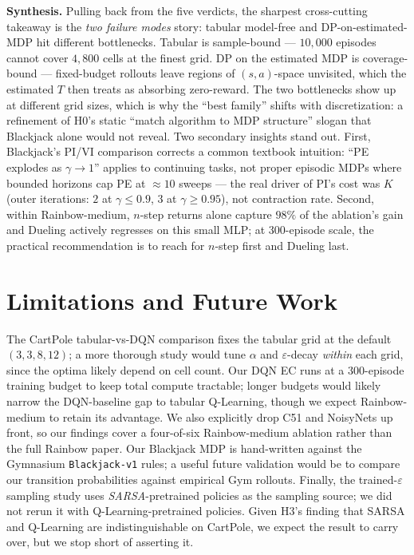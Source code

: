 \documentclass[conference]{IEEEtran}
\begin{document}
\textbf{Synthesis.} Pulling back from the five verdicts, the
sharpest cross-cutting takeaway is the \emph{two failure modes}
story: tabular model-free and DP-on-estimated-MDP hit different
bottlenecks. Tabular is sample-bound --- $10{,}000$ episodes
cannot cover $4{,}800$ cells at the finest grid. DP on the
estimated MDP is coverage-bound --- fixed-budget rollouts leave
regions of $(s, a)$-space unvisited, which the estimated $T$ then
treats as absorbing zero-reward. The two bottlenecks show up at
different grid sizes, which is why the ``best family'' shifts
with discretization: a refinement of H0's static ``match
algorithm to MDP structure'' slogan that Blackjack alone would
not reveal. Two secondary insights stand out. First, Blackjack's
PI/VI comparison corrects a common textbook intuition: ``PE
explodes as $\gamma \to 1$'' applies to continuing tasks, not
proper episodic MDPs where bounded horizons cap PE at $\approx 10$
sweeps --- the real driver of PI's cost was $K$ (outer iterations:
$2$ at $\gamma \leq 0.9$, $3$ at $\gamma \geq 0.95$), not
contraction rate. Second, within Rainbow-medium, $n$-step returns
alone capture $98\%$ of the ablation's gain and Dueling actively
regresses on this small MLP; at 300-episode scale, the practical
recommendation is to reach for $n$-step first and Dueling last.


\section{Limitations and Future Work}

The CartPole tabular-vs-DQN comparison fixes the tabular grid at
the default $(3, 3, 8, 12)$; a more thorough study would tune
$\alpha$ and $\varepsilon$-decay \emph{within} each grid, since
the optima likely depend on cell count. Our DQN EC runs at a
$300$-episode training budget to keep total compute tractable;
longer budgets would likely narrow the DQN-baseline gap to tabular
Q-Learning, though we expect Rainbow-medium to retain its
advantage. We also explicitly drop C51 and NoisyNets up front, so
our findings cover a four-of-six Rainbow-medium ablation rather
than the full Rainbow paper. Our Blackjack MDP is hand-written
against the Gymnasium \texttt{Blackjack-v1} rules; a useful future
validation would be to compare our transition probabilities
against empirical Gym rollouts. Finally, the trained-$\varepsilon$
sampling study uses \emph{SARSA}-pretrained policies as the
sampling source; we did not rerun it with Q-Learning-pretrained
policies. Given H3's finding that SARSA and Q-Learning are
indistinguishable on CartPole, we expect the result to carry over,
but we stop short of asserting it.
\end{document}
